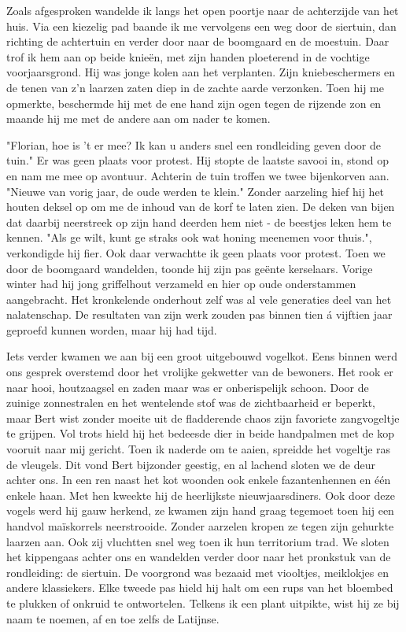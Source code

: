 \documentclass[12pt, justified, a4paper, symmetric]{tufte-book}
\begin{document}
Zoals afgesproken wandelde ik langs het open poortje naar de achterzijde van het huis. Via een kiezelig pad baande ik me vervolgens een weg door de siertuin, dan richting de achtertuin en verder door naar de boomgaard en de moestuin. Daar trof ik hem aan op beide knie\"en, met zijn handen ploeterend in de vochtige voorjaarsgrond. Hij was jonge kolen aan het verplanten. Zijn kniebeschermers en de tenen van z'n laarzen zaten diep in de zachte aarde verzonken. Toen hij me opmerkte, beschermde hij met de ene hand zijn ogen tegen de rijzende zon en maande hij me met de andere aan om nader te komen.

"Florian, hoe is 't er mee? Ik kan u anders snel een rondleiding geven door de tuin." Er was geen plaats voor protest. Hij stopte de laatste savooi in, stond op en nam me mee op avontuur. Achterin de tuin troffen we twee bijenkorven aan. "Nieuwe van vorig jaar, de oude werden te klein." Zonder aarzeling hief hij het houten deksel op om me de inhoud van de korf te laten zien. De deken van bijen dat daarbij neerstreek op zijn hand deerden hem niet - de beestjes leken hem te kennen. "Als ge wilt, kunt ge straks ook wat honing meenemen voor thuis.", verkondigde hij fier. Ook daar verwachtte ik geen plaats voor protest. Toen we door de boomgaard wandelden, toonde hij zijn pas ge\"ente kerselaars. Vorige winter had hij jong griffelhout verzameld en hier op oude onderstammen aangebracht. Het kronkelende onderhout zelf was al vele generaties deel van het nalatenschap. De resultaten van zijn werk zouden pas binnen tien \'a vijftien jaar geproefd kunnen worden, maar hij had tijd.

Iets verder kwamen we aan bij een groot uitgebouwd vogelkot. Eens binnen werd ons gesprek overstemd door het vrolijke gekwetter van de bewoners. Het rook er naar hooi, houtzaagsel en zaden maar was er onberispelijk schoon. Door de zuinige zonnestralen en het wentelende stof was de zichtbaarheid er beperkt, maar Bert wist zonder moeite uit de fladderende chaos zijn favoriete zangvogeltje te grijpen. Vol trots hield hij het bedeesde dier in beide handpalmen met de kop vooruit naar mij gericht. Toen ik naderde om te aaien, spreidde het vogeltje ras de vleugels. Dit vond Bert bijzonder geestig, en al lachend sloten we de deur achter ons. In een ren naast het kot woonden ook enkele fazantenhennen en \'e\'en enkele haan. Met hen kweekte hij de heerlijkste nieuwjaarsdiners. Ook door deze vogels werd hij gauw herkend, ze kwamen zijn hand graag tegemoet toen hij een handvol ma\"iskorrels neerstrooide. Zonder aarzelen kropen ze tegen zijn gehurkte laarzen aan. Ook zij vluchtten snel weg toen ik hun territorium trad. We sloten het kippengaas achter ons en wandelden verder door naar het pronkstuk van de rondleiding: de siertuin. De voorgrond was bezaaid met viooltjes, meiklokjes en andere klassiekers. Elke tweede pas hield hij halt om een rups van het bloembed te plukken of onkruid te ontwortelen. Telkens ik een plant uitpikte, wist hij ze bij naam te noemen, af en toe zelfs de Latijnse.
\end{document}
